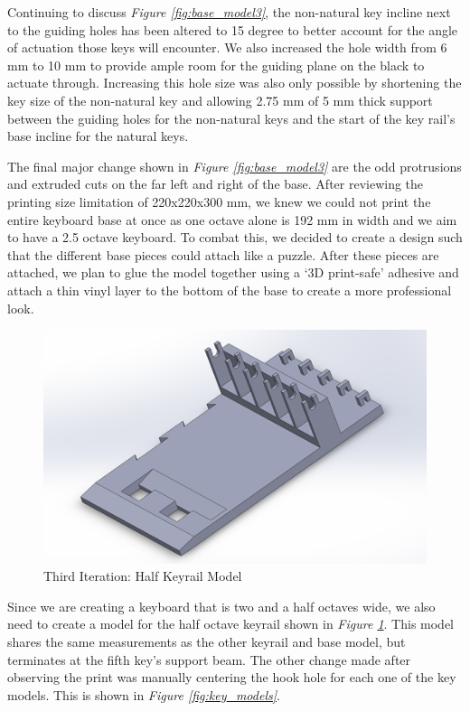 Continuing to discuss \textit{Figure \ref{fig:base_model3}}, the non-natural key incline next to the guiding holes has been altered to 15 degree to better account for the angle of actuation those keys will encounter. We also increased the hole width from 6 mm to 10 mm to provide ample room for the guiding plane on the black to actuate through. Increasing this hole size was also only possible by shortening the key size of the non-natural key and allowing 2.75 mm of 5 mm thick support between the guiding holes for the non-natural keys and the start of the key rail’s base incline for the natural keys.

The final major change shown in \textit{Figure \ref{fig:base_model3}} are the odd protrusions and extruded cuts on the far left and right of the base. After reviewing the printing size limitation of 220x220x300 mm, we knew we could not print the entire keyboard base at once as one octave alone is 192 mm in width and we aim to have a 2.5 octave keyboard. To combat this, we decided to create a design such that the different base pieces could attach like a puzzle. After these pieces are attached, we plan to glue the model together using a ‘3D print-safe’ adhesive and attach a thin vinyl layer to the bottom of the base to create a more professional look.

\begin{figure}[h!]
  \centering
  \includegraphics[width=0.8\linewidth]{image/BaseModel4.png}
  \caption{Third Iteration: Half Keyrail Model}
  \label{fig:base_model4}
\end{figure}

Since we are creating a keyboard that is two and a half octaves wide, we also need to create a model for the half octave keyrail shown in \textit{Figure \ref{fig:base_model4}}. This model shares the same measurements as the other keyrail and base model, but terminates at the fifth key’s support beam.
The other change made after observing the print was manually centering the hook hole for each one of the key models. This is shown in \textit{Figure \ref{fig:key_models}}.

